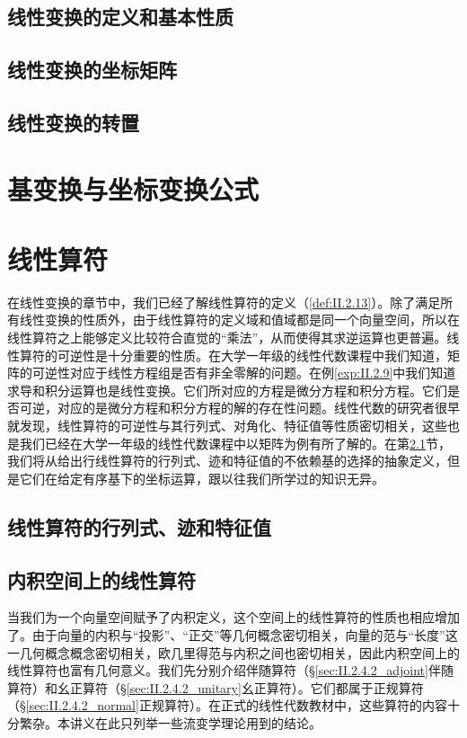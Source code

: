 \documentclass[zihao=-4,linespread=1.5,a4paper,heading=true,twoside]{ctexbook}
\theoremstyle{definition}
\theoremstyle{plain}
\begin{document}
\subsection{线性变换的定义和基本性质}\label{sec:II.2.2.1}


\subsection{线性变换的坐标矩阵}\label{sec:II.2.2.2}


\subsection{线性变换的转置}\label{sec:II.2.2.3}


\section{基变换与坐标变换公式}\label{sec:II.2.3}


\section{线性算符}\label{sec:II.2.4}
在线性变换的章节中，我们已经了解线性算符的定义（\ref{def:II.2.13}）。除了满足所有线性变换的性质外，由于线性算符的定义域和值域都是同一个向量空间，所以在线性算符之上能够定义比较符合直觉的“乘法”，从而使得其求逆运算也更普遍。线性算符的可逆性是十分重要的性质。在大学一年级的线性代数课程中我们知道，矩阵的可逆性对应于线性方程组是否有非全零解的问题。在例\ref{exp:II.2.9}中我们知道求导和积分运算也是线性变换。它们所对应的方程是微分方程和积分方程。它们是否可逆，对应的是微分方程和积分方程的解的存在性问题。线性代数的研究者很早就发现，线性算符的可逆性与其行列式、对角化、特征值等性质密切相关，这些也是我们已经在大学一年级的线性代数课程中以矩阵为例有所了解的。在第\ref{sec:II.2.4.1}节，我们将从给出行线性算符的行列式、迹和特征值的不依赖基的选择的抽象定义，但是它们在给定有序基下的坐标运算，跟以往我们所学过的知识无异。

\subsection{线性算符的行列式、迹和特征值}\label{sec:II.2.4.1}


\subsection{内积空间上的线性算符}\label{sec:II.2.4.2}
当我们为一个向量空间赋予了内积定义，这个空间上的线性算符的性质也相应增加了。由于向量的内积与“投影”、“正交”等几何概念密切相关，向量的范与“长度”这一几何概念概念密切相关，欧几里得范与内积之间也密切相关，因此内积空间上的线性算符也富有几何意义。我们先分别介绍伴随算符（\S \ref{sec:II.2.4.2_adjoint}伴随算符）和幺正算符（\S \ref{sec:II.2.4.2_unitary}幺正算符）。它们都属于正规算符（\S \ref{sec:II.2.4.2_normal}正规算符）。在正式的线性代数教材中，这些算符的内容十分繁杂。本讲义在此只列举一些流变学理论用到的结论。
\end{document}
